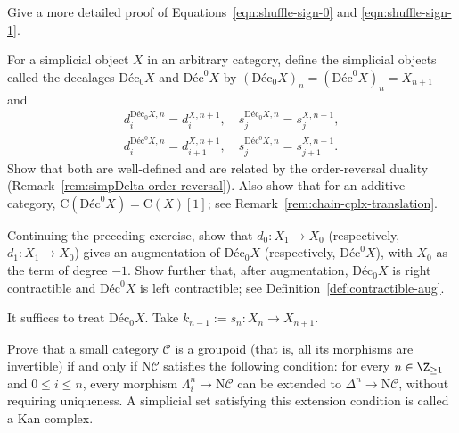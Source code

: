 	\item Give a more detailed proof of Equations~\eqref{eqn:shuffle-sign-0}
	and \eqref{eqn:shuffle-sign-1}.

	\item For a simplicial object $X$ in an arbitrary category, define the
	simplicial objects called the decalages $\mathrm{Déc}_0X$ and
	$\mathrm{Déc}^0X$ by
	$(\mathrm{Déc}_0X)_n=(\mathrm{Déc}^0X)_n=X_{n+1}$ and
	\begin{gather*}
		d^{\mathrm{Déc}_0 X, n}_i = d^{X, n+1}_i, \quad s^{\mathrm{Déc}_0 X, n}_j = s^{X, n+1}_j, \\
		d^{\mathrm{Déc}^0 X, n}_i = d^{X, n+1}_{i+1}, \quad
		s^{\mathrm{Déc}^0 X, n}_j = s^{X, n+1}_{j+1}.
	\end{gather*}
	Show that both are well-defined and are related by the order-reversal
	duality (Remark~\ref{rem:simpDelta-order-reversal}). Also show that for an
	additive category,
	$\mathrm{C}(\mathrm{Déc}^0X)=\mathrm{C}(X)[1]$; see
	Remark~\ref{rem:chain-cplx-translation}.

	\item Continuing the preceding exercise, show that
	$d_0:X_1\to X_0$ (respectively, $d_1:X_1\to X_0$) gives an augmentation
	of $\mathrm{Déc}_0X$ (respectively, $\mathrm{Déc}^0X$), with $X_0$ as
	the term of degree $-1$. Show further that, after augmentation,
	$\mathrm{Déc}_0X$ is right contractible and $\mathrm{Déc}^0X$ is left
	contractible; see Definition~\ref{def:contractible-aug}.
	\begin{hint}
		It suffices to treat $\mathrm{Déc}_0X$. Take
		$k_{n-1}:=s_n:X_n\to X_{n+1}$.
	\end{hint}

	\item Prove that a small category $\mathcal{C}$ is a groupoid (that is,
	all its morphisms are invertible) if and only if $\mathrm{N}\mathcal{C}$
	satisfies the following condition: for every $n\in\Z_{\geq1}$ and
	$0\leq i\leq n$, every morphism
	$\Lambda^n_i\to\mathrm{N}\mathcal{C}$ can be extended to
	$\Delta^n\to\mathrm{N}\mathcal{C}$, without requiring uniqueness. A
	simplicial set satisfying this extension condition is called a Kan
	complex.

